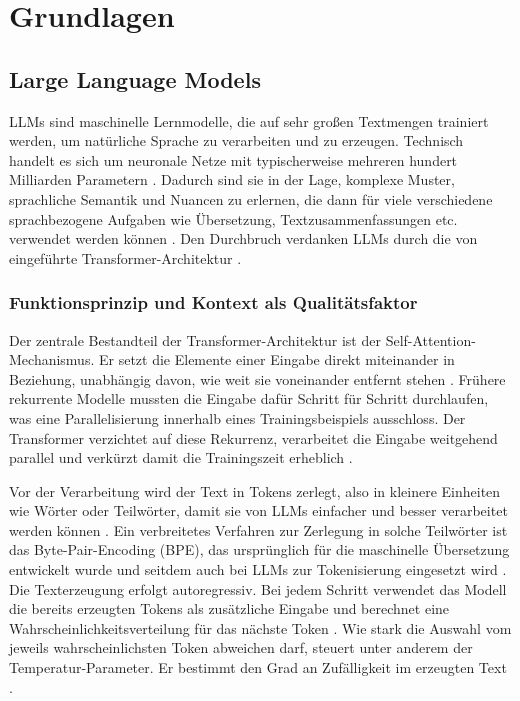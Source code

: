 \newpage
\section{Grundlagen}

\subsection{Large Language Models}

 \acp{LLM} sind maschinelle Lernmodelle, die auf sehr großen Textmengen trainiert werden, um natürliche Sprache zu verarbeiten und zu erzeugen. Technisch handelt es sich um neuronale Netze mit typischerweise mehreren hundert Milliarden Parametern \parencite[S.~4]{zhao_survey_2026}. Dadurch sind sie in der Lage, komplexe Muster, sprachliche Semantik und Nuancen zu erlernen, die dann für viele verschiedene sprachbezogene Aufgaben wie Übersetzung, Textzusammenfassungen etc. verwendet werden können \parencite[S.~2]{celik_review_2025}. Den Durchbruch verdanken \acp{LLM} durch die von \textcite{vaswani_attention_2017} eingeführte Transformer-Architektur \parencite[S.~2]{celik_review_2025}.

\subsubsection{Funktionsprinzip und Kontext als Qualitätsfaktor}

Der zentrale Bestandteil der Transformer-Architektur ist der Self-Attention-Mechanismus. Er setzt die Elemente einer Eingabe direkt miteinander in Beziehung, unabhängig davon, wie weit sie voneinander entfernt stehen \parencite[S.~6]{vaswani_attention_2017}. Frühere rekurrente Modelle mussten die Eingabe dafür Schritt für Schritt durchlaufen, was eine Parallelisierung innerhalb eines Trainingsbeispiels ausschloss. Der Transformer verzichtet auf diese Rekurrenz, verarbeitet die Eingabe weitgehend parallel und verkürzt damit die Trainingszeit erheblich \parencite[S.~1]{vaswani_attention_2017}. 

Vor der Verarbeitung wird der Text in Tokens zerlegt, also in kleinere Einheiten wie Wörter oder Teilwörter, damit sie von \acp{LLM} einfacher und besser verarbeitet werden können \parencite[S.~18]{hou_large_2024}. Ein verbreitetes Verfahren zur Zerlegung in solche Teilwörter ist das Byte-Pair-Encoding (BPE), das ursprünglich für die maschinelle Übersetzung entwickelt wurde \parencite[S.~2]{sennrich_neural_2016} und seitdem auch bei \acp{LLM} zur Tokenisierung eingesetzt wird \parencite[S.~19]{zhao_survey_2026}. Die Texterzeugung erfolgt autoregressiv. Bei jedem Schritt verwendet das Modell die bereits erzeugten Tokens als zusätzliche Eingabe und berechnet eine Wahrscheinlichkeitsverteilung für das nächste Token \parencite[S.~2,~5]{vaswani_attention_2017}. Wie stark die Auswahl vom jeweils wahrscheinlichsten Token abweichen darf, steuert unter anderem der Temperatur-Parameter. Er bestimmt den Grad an Zufälligkeit im erzeugten Text \parencite[S.~4]{plein_automatic_2023}.

